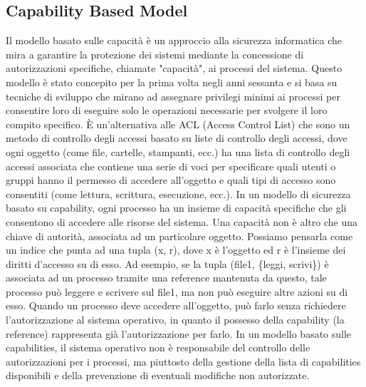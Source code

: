 \subsection{Capability Based Model}
Il modello basato sulle capacità è un approccio alla sicurezza informatica che mira a garantire la protezione dei
sistemi mediante la concessione di autorizzazioni specifiche, chiamate "capacità", ai processi del sistema. Questo
modello è stato concepito per la prima volta negli anni sessanta\cite{capability-based-security} e si basa su tecniche
di sviluppo che mirano ad assegnare privilegi minimi\cite{Saltzer1975ThePO} ai processi per consentire loro di eseguire
solo le operazioni necessarie per svolgere il loro compito specifico. È un'alternativa alle ACL (Access Control
List)\cite{samarati2001access} che sono un metodo di controllo degli accessi basato su liste di controllo degli accessi,
dove ogni oggetto (come file, cartelle, stampanti, ecc.) ha una lista di controllo degli accessi associata che contiene
una serie di voci per specificare quali utenti o gruppi hanno il permesso di accedere all'oggetto e quali tipi di
accesso sono consentiti (come lettura, scrittura, esecuzione, ecc.). In un modello di sicurezza basato su capability,
ogni processo ha un insieme di capacità specifiche che gli consentono di accedere alle risorse del sistema. Una capacità
non è altro che una chiave di autorità, associata ad un particolare oggetto. Possiamo pensarla come un indice che punta
ad una tupla\cite{wasm-capability-tuple} (x, r), dove x è l'oggetto ed r è l'insieme dei diritti d'accesso su di esso.
Ad esempio, se la tupla (file1, \{leggi, scrivi\}) è associata ad un processo tramite una reference mantenuta da questo,
tale processo può leggere e scrivere sul file1, ma non può eseguire altre azioni su di esso. Quando un processo deve
accedere all'oggetto, può farlo senza richiedere l'autorizzazione al sistema operativo, in quanto il possesso della
capability (la reference) rappresenta già l'autorizzazione per farlo. In un modello basato sulle capabilities, il
sistema operativo non è responsabile del controllo delle autorizzazioni per i processi, ma piuttosto della gestione
della lista di capabilities disponibili e della prevenzione di eventuali modifiche non autorizzate.
